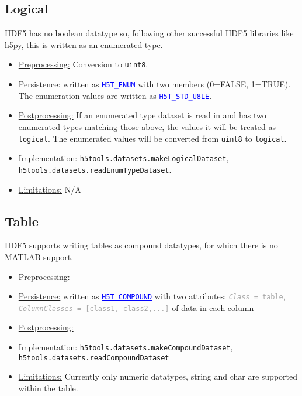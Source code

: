\documentclass[11pt]{exam}
\newcommand\myurl[1]{\textcolor{blue}{\underline{#1}}}
\newcommand\myfcn[1]{\colorbox{codegray}{\textcolor{codeblue}{\texttt{#1}}}}
\newcommand\hdftype[1]{\texttt{\myurl{#1}}}
\newcommand\myatt[2]{\textcolor{darkgray}{\texttt{\textit{#1} = #2}}}
\begin{document}
		\subsection{Logical}
		\noindent HDF5 has no boolean datatype so, following other successful HDF5 libraries like h5py, this is written as an enumerated type.
		\begin{itemize}
			\item \underline{Preprocessing:} Conversion to \texttt{uint8}.
			\item \underline{Persistence:} written as \myurl{\texttt{H5T\_ENUM}} with two members (0=FALSE, 1=TRUE). The enumeration values are written as \hdftype{H5T\_STD\_U8LE}.
			\item \underline{Postprocessing:} If an enumerated type dataset is read in and has two enumerated types matching those above, the values it will be treated as \texttt{logical}. The enumerated values will be converted from \texttt{uint8} to \texttt{logical}. 
			\item \underline{Implementation:} \myfcn{h5tools.datasets.makeLogicalDataset}, \myfcn{h5tools.datasets.readEnumTypeDataset}.
			\item \underline{Limitations:} N/A
		\end{itemize}
		
		\subsection{Table}
		\noindent HDF5 supports writing tables as compound datatypes, for which there is no MATLAB support.
		\begin{itemize}
			\item \underline{Preprocessing:} 
			\item \underline{Persistence:} written as \myurl{\texttt{H5T\_COMPOUND}} with two attributes: \myatt{Class}{table}, \myatt{ColumnClasses}{[class1, class2,...]} of data in each column
			\item \underline{Postprocessing:} 
			\item \underline{Implementation:} \myfcn{h5tools.datasets.makeCompoundDataset}, \\\myfcn{h5tools.datasets.readCompoundDataset}
			\item \underline{Limitations:} Currently only numeric datatypes, string and char are supported within the table.
		\end{itemize}
		
\end{document}
